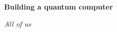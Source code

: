 \documentclass[a4paper]{article}
\begin{document}
\begin{center}
    \Huge \textbf{Building a quantum computer}
\end{center}
\vspace{-1em}

\begin{center}
    \emph{\large All of us}
\end{center}
\vspace{0.5em}








\printbibliography
\end{document}
